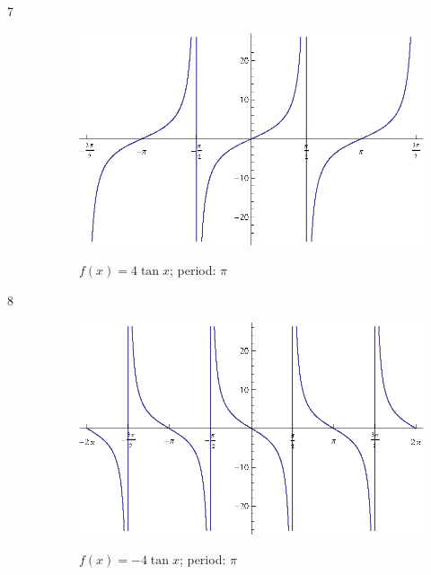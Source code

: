 \documentclass{exam}
\begin{document}
    \begin{description}

      \item[7]
        
        \begin{figure}[H]
          \centering
          \includegraphics[scale=0.9]{exercise07.eps}

          $f(x) = 4 \tan x$; period: $\pi$

        \end{figure}

      \item[8]
        \begin{figure}[H]
          \centering
          \includegraphics[scale=0.9]{exercise08.eps}

          $f(x) = -4 \tan x$; period: $\pi$
        \end{figure}


\end{description}
\end{document}
